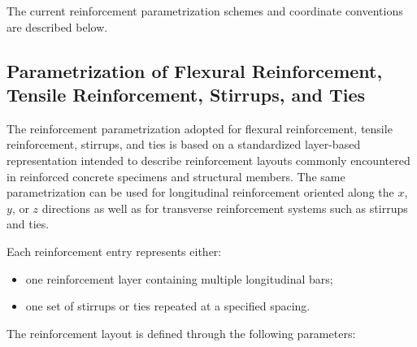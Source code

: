 \documentclass[11pt]{book}
\begin{document}
The current reinforcement parametrization schemes and coordinate conventions are described below.

\subsection{Parametrization of Flexural Reinforcement, Tensile Reinforcement, Stirrups, and Ties}

The reinforcement parametrization adopted for flexural reinforcement, tensile reinforcement, stirrups, and ties is based on a standardized layer-based representation intended to describe reinforcement layouts commonly encountered in reinforced concrete specimens and structural members. The same parametrization can be used for longitudinal reinforcement oriented along the $x$, $y$, or $z$ directions as well as for transverse reinforcement systems such as stirrups and ties.



Each reinforcement entry represents either:

\begin{itemize}
    \item one reinforcement layer containing multiple longitudinal bars;
    \item one set of stirrups or ties repeated at a specified spacing.
\end{itemize}

The reinforcement layout is defined through the following parameters:
\end{document}
